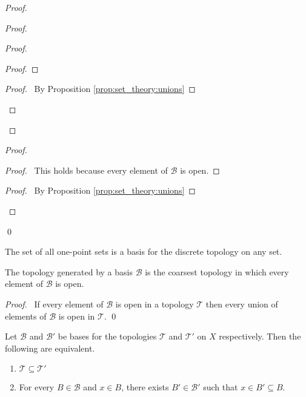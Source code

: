 \begin{proof}
\begin{proof}
\begin{proof}
\begin{proof}
      \end{proof}
      \begin{proof}
        \pf\ By Proposition \ref{prop:set_theory:unions}
      \end{proof}
    \end{proof}
  \end{proof}
  \begin{proof}
    \begin{proof}
      \pf\ This holds because every element of $\mathcal{B}$ is open.
    \end{proof}
    \begin{proof}
      \pf\ By Proposition \ref{prop:set_theory:unions}
    \end{proof}
  \end{proof}
  \qed
\end{proof}

\begin{ex}
  The set of all one-point sets is a basis for the discrete topology on any set.
\end{ex}

\begin{prop}
  \label{prop:basis:coarsest}
  The topology generated by a basis $\mathcal{B}$ is the coarsest topology in which every element of $\mathcal{B}$ is open.
\end{prop}

\begin{proof}
  \pf\ If every element of $\mathcal{B}$ is open in a topology $\mathcal{T}$ then every union of elements of $\mathcal{B}$ is open in $\mathcal{T}$. \qed
\end{proof}

\begin{prop}
  \label{prop:basis:finer}
  Let $\mathcal{B}$ and $\mathcal{B}'$ be bases for the topologies $\mathcal{T}$ and $\mathcal{T}'$ on $X$ respectively. Then the following are equivalent.
  \begin{enumerate}
    \item $\mathcal{T} \subseteq \mathcal{T}'$
    \item For every $B \in \mathcal{B}$ and $x \in B$, there exists $B' \in \mathcal{B}'$ such that $x \in B' \subseteq B$.
  \end{enumerate}
\end{prop}

